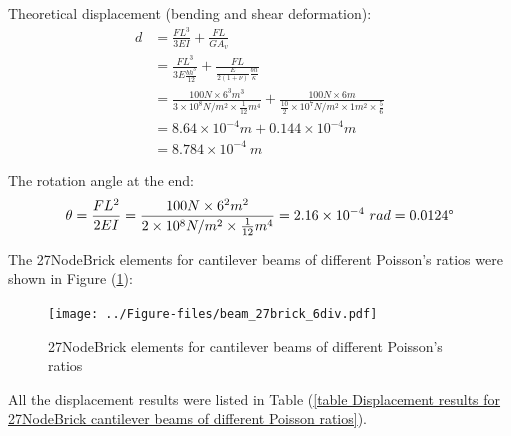 \documentclass[fleqn,11pt]{article}
\begin{document}
Theoretical displacement (bending and shear deformation):
\begin{equation}
  \begin{aligned}
  d &=\frac{FL^3}{3EI}+\frac{FL}{GA_v} \\
  &= \frac{FL^3}{3E\frac{bh^3}{12}}+\frac{FL}{\frac{E}{2(1+\nu)} \frac{bh}{\kappa}} \\ 
    &= \frac{100 N \times 6^3 m^3}{3\times 10^8 N/m^2 \times \frac{1}{12} m^4}+ 
    \frac{100 N\times 6 m}{\frac{10}{2} \times 10^7 N/m^2\times 1 m^2 \times \frac{5}{6}} \\ 
    &=8.64\times 10^{-4} m + 0.144 \times 10^{-4} m   \\
   & =8.784\times 10^{-4} \ m
   \end{aligned}
\end{equation}

The rotation angle at the end:
\begin{equation}
  \theta =\frac{FL^2}{2EI} 
   =\frac{100 N \times 6^2 m^2} {2\times 10^8 N/m^2 \times \frac{1}{12} m^4} 
 =2.16 \times 10^{-4} \ rad = 0.0124 \degree 
\end{equation}

The 27NodeBrick elements for cantilever beams of different Poisson's ratios were shown in Figure (\ref{fig 27NodeBrick elements for cantilever beams of different Poisson's ratios}):
\begin{figure}[H]
  \centering
  \texttt{[image: ../Figure-files/beam\_27brick\_6div.pdf]}
  \caption{27NodeBrick elements for cantilever beams of different Poisson's ratios}
  \label{fig 27NodeBrick elements for cantilever beams of different Poisson's ratios}
\end{figure}


All the displacement results were listed in Table (\ref{table Displacement results for 27NodeBrick cantilever beams of different Poisson ratios}). 
\end{document}
